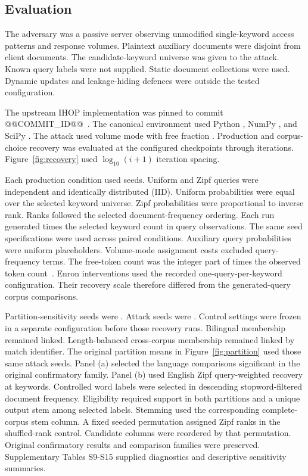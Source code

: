 \documentclass[12pt]{article}
\makeatletter
\newcommand{\CommitID}{@@COMMIT_ID@@}
\makeatother
\begin{document}
\subsection{Evaluation}
The adversary was a passive server observing unmodified single-keyword access patterns and response volumes. Plaintext auxiliary documents were disjoint from client documents. The candidate-keyword universe was given to the attack. Known query labels were not supplied. Static document collections were used. Dynamic updates and leakage-hiding defences were outside the tested configuration.

The upstream IHOP implementation was pinned to commit \CommitID{}~\cite{ihopcode}. The canonical environment used Python \PythonVersion{}, NumPy \NumpyVersion{}, and SciPy \ScipyVersion{}. The attack used volume mode with free fraction \FreeFraction{}. Production and corpus-choice recovery was evaluated at the configured checkpoints through \FinalIterations{} iterations. Figure~\ref{fig:recovery} used $\log_{10}(i+1)$ iteration spacing.

Each production condition used \SeedCount{} seeds. Uniform and Zipf queries were independent and identically distributed (IID). Uniform probabilities were equal over the selected keyword universe. Zipf probabilities were proportional to inverse rank. Ranks followed the selected document-frequency ordering. Each run generated \QueriesPerKeyword{} times the selected keyword count in query observations. The same seed specifications were used across paired conditions. Auxiliary query probabilities were uniform placeholders. Volume-mode assignment costs excluded query-frequency terms. The free-token count was the integer part of \FreeFraction{} times the observed token count~\cite{ihopcode}. Enron interventions used the recorded one-query-per-keyword configuration. Their recovery scale therefore differed from the generated-query corpus comparisons.

Partition-sensitivity seeds were \SensitivityPartitionSeeds{}. Attack seeds were \SensitivityAttackSeeds{}. Control settings were frozen in a separate configuration before those recovery runs. Bilingual membership remained linked. Length-balanced cross-corpus membership remained linked by match identifier. The original partition means in Figure~\ref{fig:partition} used those same attack seeds. Panel (a) selected the language comparisons significant in the original confirmatory family. Panel (b) used English Zipf query-weighted recovery at \Keywords{} keywords. Controlled word labels were selected in descending stopword-filtered document frequency. Eligibility required support in both partitions and a unique output stem among selected labels. Stemming used the corresponding complete-corpus stem column. A fixed seeded permutation assigned Zipf ranks in the shuffled-rank control. Candidate columns were reordered by that permutation. Original confirmatory results and comparison families were preserved. Supplementary Tables S9-S15 supplied diagnostics and descriptive sensitivity summaries.
\end{document}
